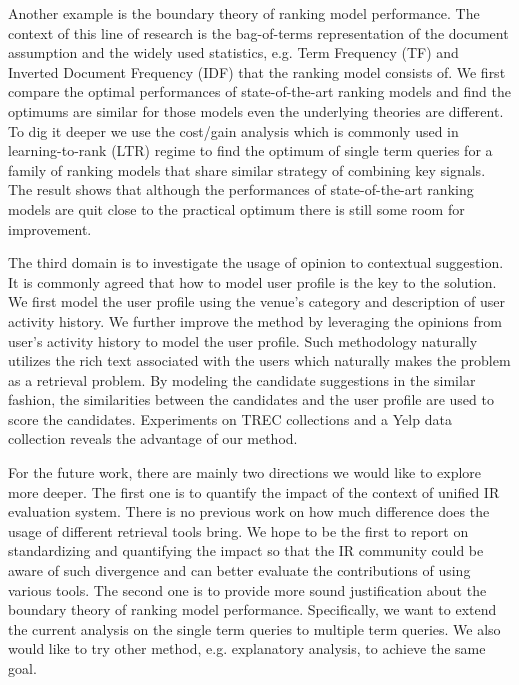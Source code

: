 Another example is the boundary theory of ranking model performance. 
The context of this line of research is the bag-of-terms representation of 
the document assumption and the widely used statistics, e.g. Term Frequency 
(TF) and Inverted Document Frequency (IDF) 
that the ranking model consists of. We first compare the optimal 
performances of state-of-the-art ranking models and find the optimums 
are similar for those models even the underlying theories are different. 
To dig it deeper we use the cost/gain analysis which is commonly used in 
learning-to-rank (LTR) regime to find the optimum of single term queries for 
a family of ranking models that share similar strategy of combining key 
signals. The result shows that although the performances of state-of-the-art 
ranking models are quit close to the practical optimum there is still some 
room for improvement.

The third domain is to investigate the usage of opinion to contextual 
suggestion. It is commonly agreed that how to model user profile is the key 
to the solution. We first model the user profile using the venue's category 
and description of user activity history. We further improve the 
method by leveraging the opinions from user's activity history to model the 
user profile. Such methodology naturally utilizes the rich text associated 
with the users which naturally makes the problem as a retrieval problem. 
By modeling the candidate suggestions in the similar fashion, 
the similarities between the candidates and the user profile are used to score 
the candidates. Experiments on TREC collections and a 
Yelp data collection reveals the advantage of our method.

For the future work, there are mainly two directions we would like to explore more deeper. 
The first one is to quantify the impact of the context of unified 
IR evaluation system. There is no previous work on how much difference does 
the usage of different retrieval tools bring.
We hope to be the first to report on standardizing and quantifying the 
impact so that the IR community could be aware of such divergence and can 
better evaluate the contributions of using various tools. 
The second one is to provide more sound justification about the boundary 
theory of ranking model performance. Specifically, we want to extend the 
current analysis on the single term queries to multiple term queries. 
We also would like to try other method, e.g. explanatory analysis, 
to achieve the same goal.
